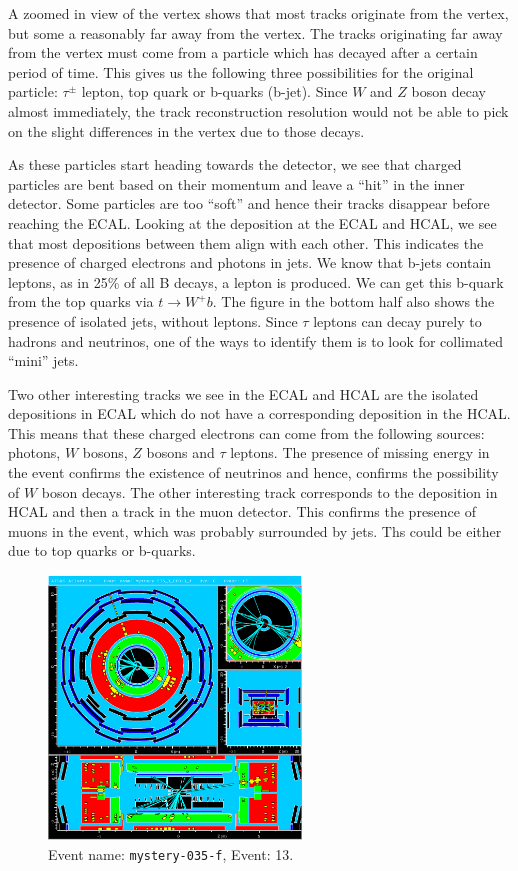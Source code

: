 \documentclass[a4paper]{report}
\numberwithin{equation}{section}
\begin{document}
A zoomed in view of the vertex shows that most tracks originate from the vertex, but some a reasonably far away from the vertex. The tracks originating far away from the vertex must come from a particle which has decayed after a certain period of time. This gives us the following three possibilities for the original particle: $\tau^{\pm}$ lepton, top quark or b-quarks (b-jet). Since $W$ and $Z$ boson decay almost immediately, the track reconstruction resolution would not be able to pick on the slight differences in the vertex due to those decays. 

As these particles start heading towards the detector, we see that charged particles are bent based on their momentum and leave a ``hit'' in the inner detector. Some particles are too ``soft'' and hence their tracks disappear before reaching the ECAL. Looking at the deposition at the ECAL and HCAL, we see that most depositions between them align with each other. This indicates the presence of charged electrons and photons in jets. We know that b-jets contain leptons, as in 25\% of all B decays, a lepton is produced. We can get this b-quark from the top quarks via $t \rightarrow W^+ b$. The figure in the bottom half also shows the presence of isolated jets, without leptons. Since $\tau$ leptons can decay purely to hadrons and neutrinos, one of the ways to identify them is to look for collimated ``mini'' jets. 
 
Two other interesting tracks we see in the ECAL and HCAL are the isolated depositions in ECAL which do not have a corresponding deposition in the HCAL. This means that these charged electrons can come from the following sources: photons, $W$ bosons, $Z$ bosons and $\tau$ leptons. The presence of missing energy in the event confirms the existence of neutrinos and hence, confirms the possibility of $W$ boson decays. The other interesting track corresponds to the deposition in HCAL and then a track in the muon detector. This confirms the presence of muons in the event, which was probably surrounded by jets. Ths could be either due to top quarks or b-quarks. 

\begin{figure}[htpb]
    \centering
    \includegraphics[width=0.6\textwidth]{mystery-035_0_00013_f-YX-RZ-RZ-YX-2022-05-23-13-28-39}
    \caption{Event name: \texttt{mystery-035-f}, Event: 13.}
    \label{fig:mys1}
\end{figure}
\end{document}
